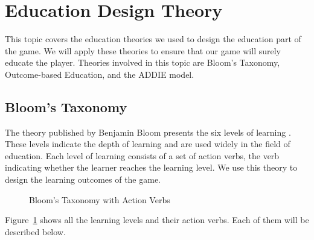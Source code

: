 \documentclass[12pt,oneside,openright,a4paper]{cpe-english-project}
\begin{document}
\section{Education Design Theory}
This topic covers the education theories we used to design the education part of the game. We will apply these theories to ensure that our game will surely educate the player. Theories involved in this topic are Bloom's Taxonomy, Outcome-based Education, and the ADDIE model.

\subsection{Bloom's Taxonomy}
The theory published by Benjamin Bloom presents the six levels of learning \cite{christine2021tophat}. These levels indicate the depth of learning and are used widely in the field of education. Each level of learning consists of a set of action verbs, the verb indicating whether the learner reaches the learning level. We use this theory to design the learning outcomes of the game.

\begin{figure}[!h]\centering
{}
\caption[Bloom’s Taxonomy with Action Verbs]{Bloom’s Taxonomy with Action Verbs \cite{christine2021tophat}}
\label{fig:theory-bloom}
\end{figure}

Figure~\ref{fig:theory-bloom} shows all the learning levels and their action verbs. Each of them will be described below.
\end{document}
